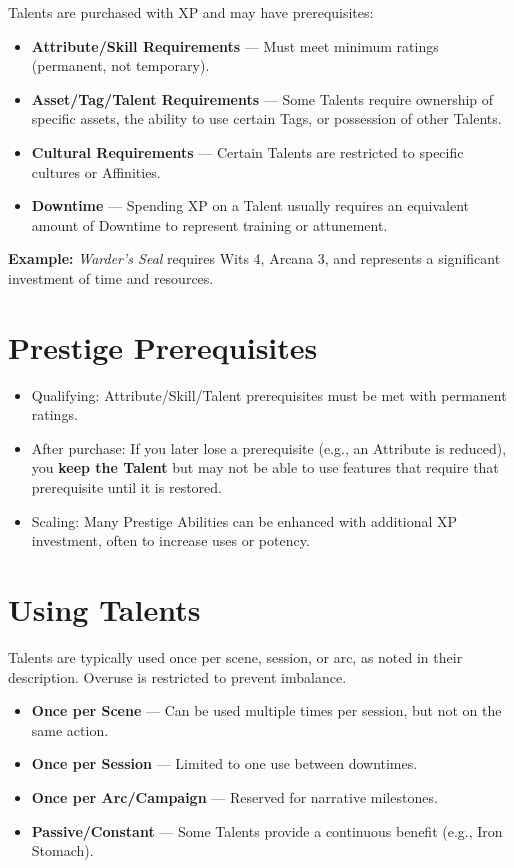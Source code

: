 Talents are purchased with XP and may have prerequisites:

\begin{itemize}
  \item \textbf{Attribute/Skill Requirements} — Must meet minimum ratings (permanent, not temporary).
  \item \textbf{Asset/Tag/Talent Requirements} — Some Talents require ownership of specific assets, the ability to use certain Tags, or possession of other Talents.
  \item \textbf{Cultural Requirements} — Certain Talents are restricted to specific cultures or Affinities.
  \item \textbf{Downtime} — Spending XP on a Talent usually requires an equivalent amount of Downtime to represent training or attunement.
\end{itemize}

\textbf{Example:} \textit{Warder's Seal} requires Wits 4, Arcana 3, and represents a significant investment of time and resources.

\section{Prestige Prerequisites}

\begin{itemize}
    \item Qualifying: Attribute/Skill/Talent prerequisites must be met with permanent ratings.
    \item After purchase: If you later lose a prerequisite (e.g., an Attribute is reduced), you \textbf{keep the Talent} but may not be able to use features that require that prerequisite until it is restored.
    \item Scaling: Many Prestige Abilities can be enhanced with additional XP investment, often to increase uses or potency.
\end{itemize}

\section{Using Talents}

Talents are typically used once per scene, session, or arc, as noted in their description. Overuse is restricted to prevent imbalance.

\begin{itemize}
  \item \textbf{Once per Scene} — Can be used multiple times per session, but not on the same action.
  \item \textbf{Once per Session} — Limited to one use between downtimes.
  \item \textbf{Once per Arc/Campaign} — Reserved for narrative milestones.
  \item \textbf{Passive/Constant} — Some Talents provide a continuous benefit (e.g., Iron Stomach).
\end{itemize}

